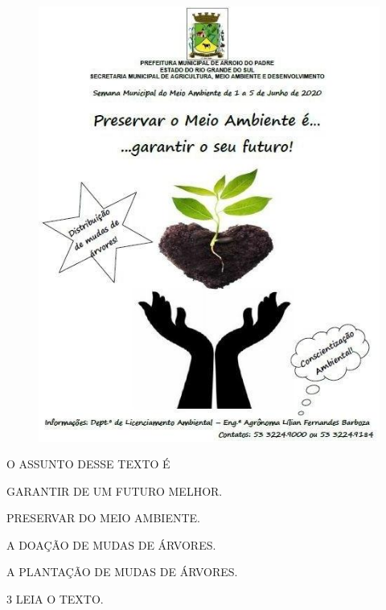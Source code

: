 \begin{figure}[htpb!]
\centering
\includegraphics[width=.7\textwidth]{media/image166.jpg}
\end{figure}


O ASSUNTO DESSE TEXTO É

\begin{escolha}
\item GARANTIR DE UM FUTURO MELHOR.

\item PRESERVAR DO MEIO AMBIENTE.

\item A DOAÇÃO DE MUDAS DE ÁRVORES.

\item A PLANTAÇÃO DE MUDAS DE ÁRVORES.
\end{escolha}

\num{3} LEIA O TEXTO.

